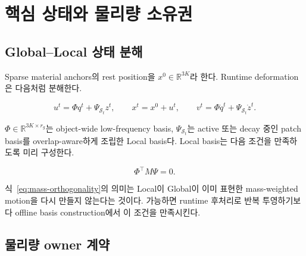 \documentclass[11pt,a4paper]{article}
\newcommand{\R}{\mathbb{R}}
\begin{document}
\section{핵심 상태와 물리량 소유권}

\subsection{Global--Local 상태 분해}

Sparse material anchors의 rest position을 \(x^0\in\R^{3K}\)라 한다.
Runtime deformation은 다음처럼 분해한다.

\begin{equation}
  u^t
  =
  \Phi q^t
  +
  \Psi_{\mathcal S_t}z^t,
  \qquad
  x^t=x^0+u^t,
  \qquad
  v^t=\Phi\dot q^t+\Psi_{\mathcal S_t}\dot z^t.
  \label{eq:state-decomposition}
\end{equation}

\(\Phi\in\R^{3K\times r_g}\)는 object-wide low-frequency basis,
\(\Psi_{\mathcal S_t}\)는 active 또는 decay 중인 patch basis를
overlap-aware하게 조립한 Local basis다.
Local basis는 다음 조건을 만족하도록 미리 구성한다.

\begin{equation}
  \Phi^\top M\Psi=0.
  \label{eq:mass-orthogonality}
\end{equation}

식~\eqref{eq:mass-orthogonality}의 의미는 Local이 Global이 이미 표현한
mass-weighted motion을 다시 만들지 않는다는 것이다.
가능하면 runtime 후처리로 반복 투영하기보다 offline basis construction에서 이 조건을 만족시킨다.

\subsection{물리량 owner 계약}
\end{document}

